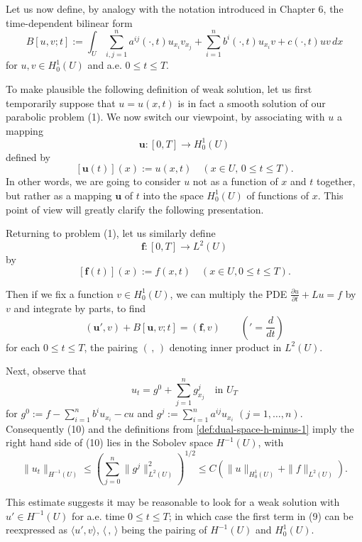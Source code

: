 Let us now define, by analogy with the notation introduced in Chapter 6, the time-dependent bilinear form
\[
B[u, v; t] := \int_U \sum_{i,j=1}^n a^{ij}(\cdot, t) u_{x_i} v_{x_j} + \sum_{i=1}^n b^i(\cdot, t) u_{x_i} v + c(\cdot, t) uv \, dx
\tag{8}
\]
for $u, v \in H_0^1(U)$ and a.e. $0 \le t \le T$.

\begin{remark}
\label{rem:motivation-weak-solution-parabolic}
To make plausible the following definition of weak solution, let us first temporarily suppose that $u = u(x,t)$ is in fact a smooth solution of our parabolic problem (1). We now switch our viewpoint, by associating with $u$ a mapping
\[
\mathbf{u} : [0, T] \to H_0^1(U)
\]
defined by
\[
[\mathbf{u}(t)](x) := u(x, t) \quad (x \in U, \, 0 \le t \le T).
\]
In other words, we are going to consider $u$ not as a function of $x$ and $t$ together, but rather as a mapping $\mathbf{u}$ of $t$ into the space $H_0^1(U)$ of functions of $x$. This point of view will greatly clarify the following presentation.

Returning to problem (1), let us similarly define
\[
\mathbf{f} : [0, T] \to L^2(U)
\]
by
\[
[\mathbf{f}(t)](x) := f(x,t) \quad (x \in U, 0 \le t \le T).
\]

Then if we fix a function $v \in H_0^1(U)$, we can multiply the PDE $\frac{\partial u}{\partial t} + Lu = f$ by $v$ and integrate by parts, to find
\[
(\mathbf{u}', v) + B[\mathbf{u},v;t] = (\mathbf{f},v) \qquad \left({}' = \frac{d}{dt}\right)
\tag{9}
\]
for each $0 \le t \le T$, the pairing $(\,, \,)$ denoting inner product in $L^2(U)$.

Next, observe that
\[
u_t = g^0 + \sum_{j=1}^n g^j_{x_j} \quad \text{in } U_T
\tag{10}
\]
for $g^0 := f - \sum_{i=1}^n b^i u_{x_i} - cu$ and $g^j := \sum_{i=1}^n a^{ij} u_{x_i}$ $(j = 1, \ldots, n)$. Consequently (10) and the definitions from \cref{def:dual-space-h-minus-1} imply the right hand side of (10) lies in the Sobolev space $H^{-1}(U)$, with
\[
\|u_t\|_{H^{-1}(U)} \le \left(\sum_{j=0}^n \|g^j\|_{L^2(U)}^2\right)^{1/2} \le C\left(\|u\|_{H_0^1(U)} + \|f\|_{L^2(U)}\right).
\]

This estimate suggests it may be reasonable to look for a weak solution with $u' \in H^{-1}(U)$ for a.e. time $0 \le t \le T$; in which case the first term in (9) can be reexpressed as $\langle u', v \rangle$, $\langle \, , \, \rangle$ being the pairing of $H^{-1}(U)$ and $H_0^1(U)$.
\end{remark}

